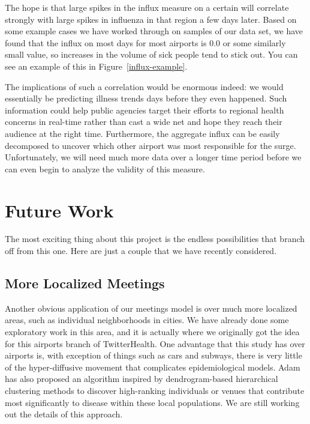 \documentclass[11pt, letterpaper]{article}
\begin{document}
            The hope is that large spikes in the influx measure on a certain will correlate strongly with large spikes in influenza in that region a few days later. Based on some example cases we have worked through on samples of our data set, we have found that the influx on most days for most airports is 0.0 or some similarly small value, so increases in the volume of sick people tend to stick out. You can see an example of this in Figure~\ref{influx-example}.

            The implications of such a correlation would be enormous indeed: we would essentially be predicting illness trends days before they even happened. Such information could help public agencies target their efforts to regional health concerns in real-time rather than cast a wide net and hope they reach their audience at the right time. Furthermore, the aggregate influx can be easily decomposed to uncover which other airport was most responsible for the surge. Unfortunately, we will need much more data over a longer time period before we can even begin to analyze the validity of this measure.

    \section{Future Work}
        The most exciting thing about this project is the endless possibilities that branch off from this one. Here are just a couple that we have recently considered.

        \subsection{More Localized Meetings}
            Another obvious application of our meetings model is over much more localized areas, such as individual neighborhoods in cities. We have already done some exploratory work in this area, and it is actually where we originally got the idea for this airports branch of TwitterHealth. One advantage that this study has over airports is, with exception of things such as cars and subways, there is very little of the hyper-diffusive movement that complicates epidemiological models. Adam has also proposed an algorithm inspired by dendrogram-based hierarchical clustering methods to discover high-ranking individuals or venues that contribute most significantly to disease within these local populations. We are still working out the details of this approach.
\end{document}
